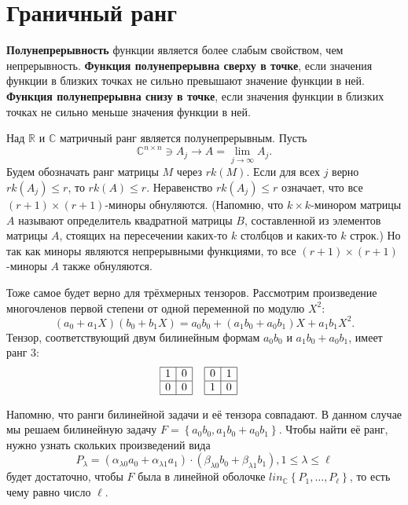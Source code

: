 \section{Граничный ранг}

\begin{definition}
  \textbf{Полунепрерывность} функции является более слабым свойством, чем непрерывность. \textbf{Функция полунепрерывна сверху в точке}, если значения функции в близких точках не сильно превышают значение функции в ней. \textbf{Функция полунепрерывна снизу в точке}, если значения функции в близких точках не сильно меньше значения функции в ней.
\end{definition}
Над $\mathbb{R}$ и $\mathbb{C}$ матричный ранг является полунепрерывным. Пусть
\[
	\mathbb{C}^{n \times n} \ni A_j \to A = \lim_{j \to \infty} A_j.
\]
Будем обозначать ранг матрицы $M$ через $rk(M)$. Если для всех $j$ верно $rk(A_j) \leq r$, то $rk(A) \leq r$. Неравенство $rk(A_j) \leq r$ означает, что все $(r+1) \times (r+1)$-миноры обнуляются. (Напомню, что $k \times k$-минором матрицы $A$ называют определитель квадратной матрицы $B$, составленной из элементов матрицы $A$, стоящих на пересечении каких-то $k$ столбцов и каких-то $k$ строк.) Но так как миноры являются непрерывными функциями, то все $(r+1) \times (r+1)$-миноры $A$ также обнуляются.

Тоже самое будет верно для трёхмерных тензоров. Рассмотрим произведение многочленов первой степени от одной переменной по модулю $X^2$:
\[
	(a_0+a_1 X)(b_0 + b_1 X)= a_0 b_0 + (a_1 b_0 + a_0 b_1)X + a_1 b_1 X^2.
\]
Тензор, соответствующий двум билинейным формам $a_0 b_0$ и $a_1 b_0 + a_0 b_1$, имеет ранг 3:
\begin{align*}
  \begin{array}{|c|c|}
  \hline
  1 & 0 \\
  \hline
  0 & 0\\
  \hline
 \end{array}  & \;\;\;\;
 \begin{array}{|c|c|}
  \hline
  0 & 1 \\
  \hline
  1 & 0\\
  \hline
 \end{array} 
\end{align*}

Напомню, что ранги билинейной задачи и её тензора совпадают. В данном случае мы решаем билинейную задачу $F = \left\{ a_0 b_0, a_1 b_0 + a_0 b_1 \right\}$. Чтобы найти её ранг, нужно узнать скольких произведений вида
\[
	P_{\lambda} = \left( \alpha_{\lambda 0} a_0 + \alpha_{\lambda 1} a_1 \right) \cdot \left( \beta_{\lambda 0} b_0 + \beta_{\lambda 1} b_1 \right), 1 \leq \lambda \leq \ell
\]
будет достаточно, чтобы $F$ была в линейной оболочке $lin_{\mathbb{C}}\left\{ P_1, \dotsc, P_{\ell} \right\}$, то есть чему равно число $\ell$.

